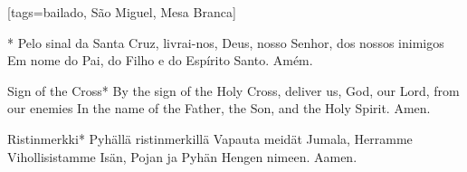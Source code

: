 [tags={bailado, São Miguel, Mesa Branca}]
  \begin{passage}[PT]{}*
    Pelo sinal da Santa Cruz,
    livrai-nos, Deus, nosso Senhor,
    dos nossos inimigos
    \polpar
    Em nome do Pai, do Filho e do Espírito Santo.
    \polpar
    Amém.
  \end{passage}
  \begin{passage}[EN]{Sign of the Cross}*
    By the sign of the Holy Cross,
    deliver us, God, our Lord,
    from our enemies
    \polpar
    In the name of the Father, the Son, and the Holy Spirit.
    \polpar
    Amen.
  \end{passage}
  \begin{passage}[FI]{Ristinmerkki}*
    Pyhällä ristinmerkillä
    Vapauta meidät Jumala, Herramme
    Vihollisistamme
    \polpar
    Isän, Pojan ja Pyhän Hengen nimeen.
    \polpar
    Aamen.
  \end{passage}
  \vspace*{\fill}
\endsong
